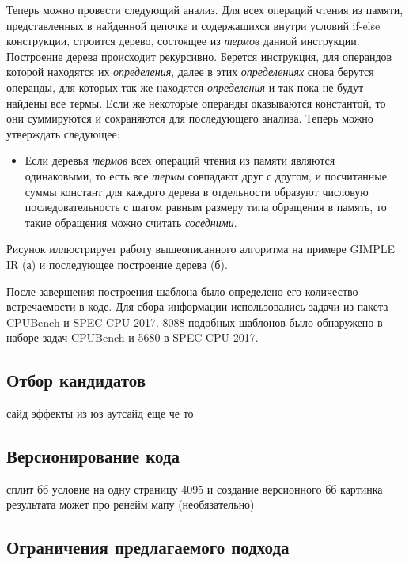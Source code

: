 Теперь можно провести следующий анализ. Для всех операций чтения из памяти, представленных в найденной цепочке и содержащихся внутри условий if-else конструкции, строится дерево, состоящее из \textit{термов} данной инструкции. Построение дерева происходит рекурсивно. Берется инструкция, для операндов которой находятся их \textit{определения}, далее в этих \textit{определениях} снова берутся операнды, для которых так же находятся \textit{определения} и так пока не будут найдены все термы. Если же некоторые операнды оказываются константой, то они суммируются и сохраняются для последующего анализа. Теперь можно утверждать следующее:

\begin{itemize}
    \item Если деревья \textit{термов} всех операций чтения из памяти являются одинаковыми, то есть все \textit{термы} совпадают друг с другом, и посчитанные суммы констант для каждого дерева в отдельности образуют числовую последовательность с шагом равным размеру типа обращения в память, то такие обращения можно считать \textit{соседними}.
\end{itemize}

Рисунок  иллюстрирует работу вышеописанного алгоритма на примере GIMPLE IR (а) и последующее построение дерева (б).


После завершения построения шаблона было определено его количество встречаемости в коде. Для сбора информации использовались задачи из пакета CPUBench и SPEC CPU 2017. 8088 подобных шаблонов было обнаружено в наборе задач CPUBench и 5680 в SPEC CPU 2017.

\subsection{Отбор кандидатов}
сайд эффекты
из юз аутсайд
еще че то
\subsection{Версионирование кода}
сплит бб 
условие на одну страницу 4095 и создание версионного бб
картинка результата
может про ренейм мапу (необязательно)

\subsection{Ограничения предлагаемого подхода}

\newpage
